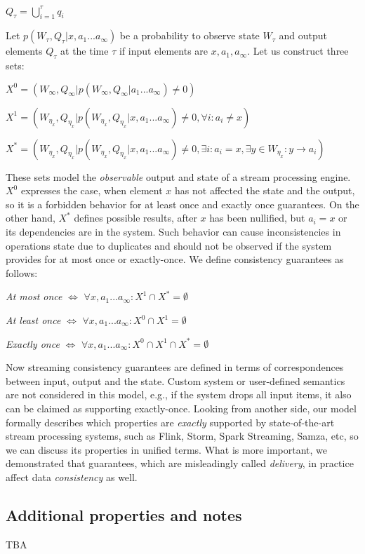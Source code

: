 \documentclass[sigconf]{acmart}
\theoremstyle{remark}
\begin{document}
$Q_\tau=\bigcup\limits_{i=1}^{\tau}{q_i}$

Let $p(W_\tau,Q_\tau|x,a_1...a_\infty)$ be a probability to observe state $W_\tau$ and output elements $Q_\tau$ at the time $\tau$ if input elements are $x,a_1,a_\infty$. Let us construct three sets:

$X^0=(W_\infty,Q_\infty|p(W_\infty,Q_\infty|a_1...a_\infty)\neq{0})$

$X^1=(W_{\eta_{x}},Q_{\eta_{x}}|p(W_{\eta_{x}},Q_{\eta_{x}}|x,a_1...a_\infty)\neq{0},\forall{i}:{a_i}\neq{x})$

$X^{*}=(W_{\eta_{x}},Q_{\eta_{x}}|p(W_{\eta_{x}},Q_{\eta_{x}}|x,a_1...a_\infty)\neq{0},\exists{i}:{a_i={x}},\exists{y\in{W_{\eta_{x}}}}:y\to{a_i})$

These sets model the {\em observable} output and state of a stream processing engine. $X^0$ expresses the case, when element $x$ has not affected the state and the output, so it is a forbidden behavior for at least once and exactly once guarantees. On the other hand, $X^{*}$ defines possible results, after $x$ has been nullified, but $a_i=x$ or its dependencies are in the system. Such behavior can cause inconsistencies in operations state due to duplicates and should not be observed if the system provides for at most once or exactly-once. We define consistency guarantees as follows: 

{\em At most once} $\iff$ $\forall{x,a_1...a_\infty}:X^{1}\cap{X^{*}}=\emptyset$

{\em At least once} $\iff$ $\forall{x,a_1...a_\infty}:X^{0}\cap{X^{1}}=\emptyset$

{\em Exactly once} $\iff$ $\forall{x,a_1...a_\infty}:X^{0}\cap{X^{1}}\cap{X^{*}}=\emptyset$

Now streaming consistency guarantees are defined in terms of correspondences between input, output and the state. Custom system or user-defined semantics are not considered in this model, e.g., if the system drops all input items, it also can be claimed as supporting exactly-once. Looking from another side, our model formally describes which properties are {\em exactly} supported by state-of-the-art stream processing systems, such as Flink, Storm, Spark Streaming, Samza, etc, so we can discuss its properties in unified terms. What is more important, we demonstrated that guarantees, which are misleadingly called {\em delivery}, in practice affect data {\em consistency} as well.

\subsection{Additional properties and notes}
 
 TBA



\end{document}
